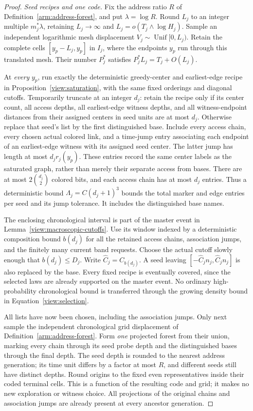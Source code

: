 \begin{proof}
\emph{Seed recipes and one code.}
Fix the address ratio $R$ of Definition~\ref{arm:address-forest}, and put
$\lambda=\log R$.  Round $L_j$ to an integer multiple
$m_j^*\lambda$, retaining $L_j\to\infty$ and
$L_j=o(T_j\wedge\log H_j)$.  Sample an independent logarithmic mesh
displacement $V_j\sim\operatorname{Unif}[0,L_j)$.  Retain the complete
cells $[y_p-L_j,y_p]$ in $I_j$, where the endpoints $y_p$ run through
this translated mesh.  Their number $P_j^*$ satisfies
$P_j^*L_j=T_j+O(L_j)$.

At \emph{every} $y_p$, run exactly the deterministic greedy-center and
earliest-edge recipe in Proposition~\ref{view:saturation}, with the
same fixed orderings and diagonal cutoffs.  Temporarily truncate at an
integer $d_j$: retain the recipe only if its center count, all access
depths, all earliest-edge witness depths, and all witness-endpoint
distances from their assigned centers in seed units are at most $d_j$.
Otherwise replace that seed's list by the first distinguished base.
Include every access chain, every chosen actual colored link, and a
time-jump entry associating each endpoint of an earliest-edge witness
with its assigned seed center.  The latter jump has length at most
$d_jr_j(y_p)$.  These entries record the same center labels as the
saturated graph, rather than merely their separate access from bases.
There are at most $2\binom{d_j}{2}$ colored bits, and each access chain
has at most $d_j$ entries.  Thus a deterministic bound
$\Lambda_j=C(d_j+1)^3$ bounds the total marker and edge entries per
seed and its jump tolerance.  It includes the distinguished base names.

The enclosing chronological interval is part of the master event in
Lemma~\ref{view:macroscopic-cutoffs}.  Use its window indexed by a
deterministic composition bound $b(d_j)$ for all the retained access
chains, association jumps, and the finitely many current band requests.
Choose the actual cutoff slowly enough that $b(d_j)\le D_j$.
Write $\widehat C_j=C_{b(d_j)}$.  A seed leaving
$[-\widehat C_jn_j,\widehat C_jn_j]$ is also replaced by the base.
Every fixed recipe is eventually covered, since the selected laws
are already supported on the master event.  No ordinary
high-probability chronological bound is transferred through the growing
density bound in Equation~\eqref{view:selection}.

All lists have now been chosen, including the association jumps.
Only next sample the independent chronological grid displacement of
Definition~\ref{arm:address-forest}.  Form \emph{one} projected forest
from their union, marking every chain through its seed probe depth and
the distinguished bases through the final depth.  The seed depth is
rounded to the nearest address generation; its time unit differs by a
factor at most $R$, and different seeds still have distinct depths.
Round origins to the fixed even representatives inside their coded
terminal cells.  This is a function of the resulting code and grid;
it makes no new exploration or witness choice.  All projections of the
original chains and association jumps are already present at every
ancestor generation.


\end{proof}
